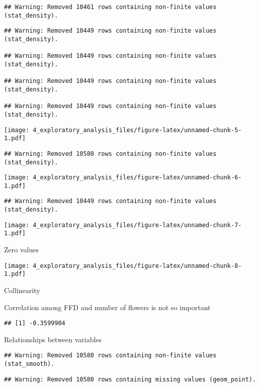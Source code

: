 \documentclass[]{article}
\begin{document}
\begin{verbatim}
## Warning: Removed 10461 rows containing non-finite values (stat_density).
\end{verbatim}

\begin{verbatim}
## Warning: Removed 10449 rows containing non-finite values (stat_density).

## Warning: Removed 10449 rows containing non-finite values (stat_density).

## Warning: Removed 10449 rows containing non-finite values (stat_density).

## Warning: Removed 10449 rows containing non-finite values (stat_density).
\end{verbatim}

\texttt{[image: 4\_exploratory\_analysis\_files/figure-latex/unnamed-chunk-5-1.pdf]}

\begin{verbatim}
## Warning: Removed 10580 rows containing non-finite values (stat_density).
\end{verbatim}

\texttt{[image: 4\_exploratory\_analysis\_files/figure-latex/unnamed-chunk-6-1.pdf]}

\begin{verbatim}
## Warning: Removed 10449 rows containing non-finite values (stat_density).
\end{verbatim}

\texttt{[image: 4\_exploratory\_analysis\_files/figure-latex/unnamed-chunk-7-1.pdf]}

Zero values

\texttt{[image: 4\_exploratory\_analysis\_files/figure-latex/unnamed-chunk-8-1.pdf]}

Collinearity

Correlation among FFD and number of flowers is not so important

\begin{verbatim}
## [1] -0.3599904
\end{verbatim}

Relationships between variables

\begin{verbatim}
## Warning: Removed 10580 rows containing non-finite values (stat_smooth).
\end{verbatim}

\begin{verbatim}
## Warning: Removed 10580 rows containing missing values (geom_point).
\end{verbatim}
\end{document}
